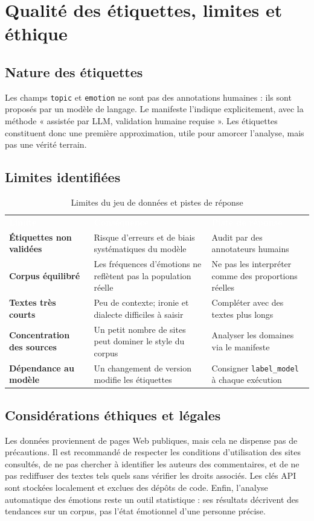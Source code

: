 \documentclass[11pt,a4paper]{article}
\newcommand{\headtab}[1]{\textcolor{white}{\sffamily\bfseries #1}}
\begin{document}
\section{Qualité des étiquettes, limites et éthique}
\label{sec:limites}
\subsection{Nature des étiquettes}
Les champs \texttt{topic} et \texttt{emotion} ne sont pas des annotations humaines : ils sont proposés par un modèle de langage. Le manifeste l'indique explicitement, avec la méthode « assistée par LLM, validation humaine requise ». Les étiquettes constituent donc une première approximation, utile pour amorcer l'analyse, mais pas une vérité terrain.

\subsection{Limites identifiées}
\begin{table}[H]
\centering
\caption{Limites du jeu de données et pistes de réponse}
\begin{tabularx}{\linewidth}{>{\sffamily\bfseries\small}p{3.3cm} X X}
\rowcolor{navy}\headtab{Limite} & \headtab{Conséquence} & \headtab{Piste de réponse} \\
Étiquettes non validées & Risque d'erreurs et de biais systématiques du modèle & Audit par des annotateurs humains \\
Corpus équilibré & Les fréquences d'émotions ne reflètent pas la population réelle & Ne pas les interpréter comme des proportions réelles \\
Textes très courts & Peu de contexte; ironie et dialecte difficiles à saisir & Compléter avec des textes plus longs \\
Concentration des sources & Un petit nombre de sites peut dominer le style du corpus & Analyser les domaines via le manifeste \\
Dépendance au modèle & Un changement de version modifie les étiquettes & Consigner \texttt{label\_model} à chaque exécution \\
\bottomrule
\end{tabularx}
\end{table}

\subsection{Considérations éthiques et légales}
Les données proviennent de pages Web publiques, mais cela ne dispense pas de précautions. Il est recommandé de respecter les conditions d'utilisation des sites consultés, de ne pas chercher à identifier les auteurs des commentaires, et de ne pas rediffuser des textes tels quels sans vérifier les droits associés. Les clés API sont stockées localement et exclues des dépôts de code. Enfin, l'analyse automatique des émotions reste un outil statistique : ses résultats décrivent des tendances sur un corpus, pas l'état émotionnel d'une personne précise.
\end{document}
